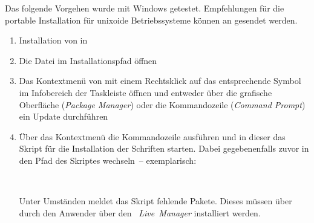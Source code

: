 %
Das folgende Vorgehen wurde mit Windows getestet. Empfehlungen für die portable 
Installation für unixoide Betriebssysteme können an \mailto{\TUDScriptContact} 
gesendet werden.
\begin{enumerate}
\item Installation von  in 
\item Die Datei  im Installationspfad öffnen
\item Das Kontextmenü von  mit einem 
  Rechtsklick auf das entsprechende Symbol im Infobereich der Taskleiste    
  öffnen und entweder über die grafische Oberfläche (\emph{Package Manager}) 
  oder die Kommandozeile (\emph{Command Prompt}) ein Update durchführen
\item Über das Kontextmenü die Kommandozeile ausführen und in dieser das Skript 
  für die Installation der Schriften  starten. 
  Dabei gegebenenfalls zuvor in den Pfad des Skriptes wechseln~-- exemplarisch:
  \begin{quoting}[leftmargin=1.5em,rightmargin=0pt]
  \newline%
  \,
  \end{quoting}
  Unter Umständen meldet das Skript fehlende Pakete. Dieses müssen über durch 
  den Anwender über den \emph{~Live~Manager} installiert werden.
\end{enumerate}

